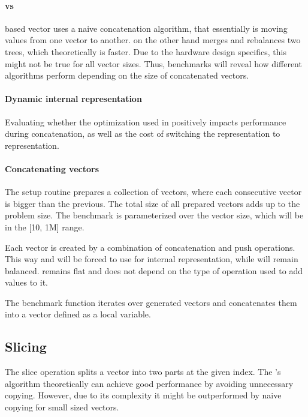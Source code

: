 \paragraph*{\rbtree{} vs \rrbtree{}}
\rbtree{} based vector uses a naive concatenation algorithm, that essentially is moving values from one vector to another. \rrbtree on the other hand merges and rebalances two trees, which theoretically is faster. Due to the hardware design specifics, this might not be true for all vector sizes. Thus, benchmarks will reveal how different algorithms perform depending on the size of concatenated vectors. 

\paragraph*{Dynamic internal representation}
Evaluating whether the \stdvec{} optimization used in \pvec{} positively impacts performance during concatenation, as well as the cost of switching the representation to \rrbvec{} representation. 

\paragraph*{Concatenating vectors}
The setup routine prepares a collection of vectors, where each consecutive vector is bigger than the previous. The total size of all prepared vectors adds up to the problem size. The benchmark is parameterized over the vector size, which will be in the [10, 1M] range. 

Each vector is created by a combination of concatenation and push operations. This way \pvec{} and \rrbvec{} will be forced to use \rrbtree{} for internal representation, while \rbvec{} will remain balanced. \stdvec{} remains flat and does not depend on the type of operation used to add values to it. 

The benchmark function iterates over generated vectors and concatenates them into a vector defined as a local variable. 

\subsection{Slicing}

The slice operation splits a vector into two parts at the given index. The \rrbtree{}'s algorithm theoretically can achieve good performance by avoiding unnecessary copying. However, due to its complexity it might be outperformed by naive copying for small sized vectors. 

